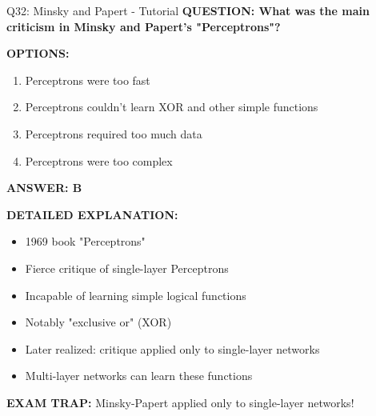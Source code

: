 \documentclass[8pt]{beamer}
\begin{document}
	\begin{frame}{Q32: Minsky and Papert - Tutorial}
		\fontsize{6.5}{7.5}\selectfont
		\textbf{QUESTION: What was the main criticism in Minsky and Papert's "Perceptrons"?}
		
		\vspace{0.1cm}
		\textbf{OPTIONS:}
		\begin{enumerate}
			\item Perceptrons were too fast
			\item Perceptrons couldn't learn XOR and other simple functions
			\item Perceptrons required too much data
			\item Perceptrons were too complex
		\end{enumerate}
		
		\vspace{0.1cm}
		\textcolor{myblue}{\textbf{ANSWER: B}}
		
		\vspace{0.1cm}
		\textbf{DETAILED EXPLANATION:}
		\begin{itemize}
			\item 1969 book "Perceptrons"
			\item Fierce critique of single-layer Perceptrons
			\item Incapable of learning simple logical functions
			\item Notably "exclusive or" (XOR)
			\item Later realized: critique applied only to single-layer networks
			\item Multi-layer networks can learn these functions
		\end{itemize}
		
		\vspace{0.1cm}
		\textcolor{myred}{\textbf{EXAM TRAP:}} Minsky-Papert applied \textcolor{myblue}{only to single-layer networks}!
	\end{frame}
	
\end{document}
